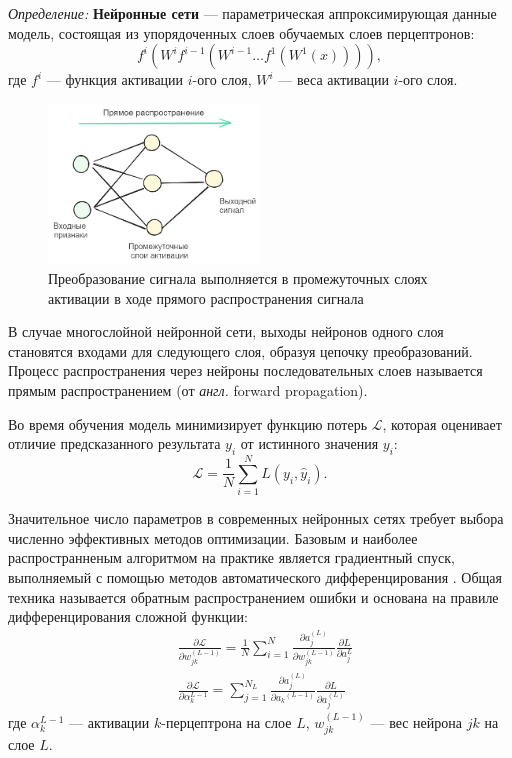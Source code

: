 \textit{Определение:} \textbf{Нейронные сети} --- параметрическая аппроксимирующая данные модель, состоящая из упорядоченных слоев
обучаемых слоев перцептронов:
\begin{equation}
  f^i(W^i f^{i-1}(W^{i-1} \dots f^1(W^1(x)))),
\end{equation}
где $f^i$ --- функция активации $i$-ого слоя, $W^i$ --- веса активации $i$-ого слоя.

\begin{figure}[h]
  \centering
  \includegraphics[width=0.5\textwidth]{assets/ml/nn/nn.excalidraw.png}
  \caption{Преобразование сигнала выполняется в промежуточных слоях активации в ходе прямого распространения сигнала}
  \label{neural_net}
\end{figure}

В случае многослойной нейронной сети, выходы нейронов одного слоя становятся входами для следующего слоя, 
образуя цепочку преобразований. Процесс распространения через нейроны последовательных слоев называется 
прямым распространением (от \textit{англ.} forward propagation).

Во время обучения модель минимизирует функцию потерь $\mathcal{L}$, которая оценивает отличие предсказанного 
результата $y_i$ от истинного значения $y_i$:
\begin{equation}
  \mathcal{L} = \frac{1}{N} \sum_{i=1}^{N} L(y_i, \hat{y}_i).
\end{equation}

Значительное число параметров в современных нейронных сетях требует
выбора численно эффективных методов оптимизации. Базовым и наиболее распространненым алгоритмом на практике является 
градиентный спуск, выполняемый с помощью методов автоматического дифференцирования \cite{paszke2017automatic}\cite{baydin2018automatic}.
Общая техника называется обратным распространением ошибки \cite{rumelhart1986learning} и основана на правиле дифференцирования
сложной функции:
\begin{equation}
  \begin{aligned}
    & \frac{\partial \mathcal{L}}{\partial w_{jk}^{(L-1)}} = \frac{1}{N} \sum_{i=1}^{N} \frac{\partial a_j^{(L)}}{\partial w_{jk}^{(L-1)}} \frac{\partial L}{\partial a_j^{L}} \\
    & \frac{\partial \mathcal{L}}{\partial \alpha^{L-1}_k} = \sum_{j=1}^{N_L} \frac{\partial{a_j^{(L)}}}{\partial{a_k}^{(L-1)}} \frac{\partial{L}}{\partial a_j^{(L)}}
  \end{aligned}
\end{equation}
где $\alpha^{L-1}_k$ --- активации $k$-перцептрона на слое $L$,  $w_{jk}^{(L-1)}$ --- вес нейрона $jk$ на слое $L$.

